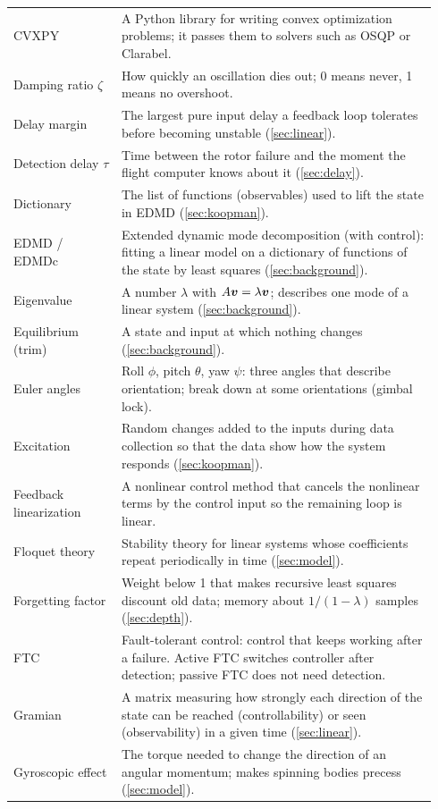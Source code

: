 \begin{longtable}{p{0.24\linewidth}p{0.70\linewidth}}
CVXPY & A Python library for writing convex optimization problems; it passes them to solvers such as OSQP or Clarabel. \\
Damping ratio $\zeta$ & How quickly an oscillation dies out; 0 means never, 1 means no overshoot. \\
Delay margin & The largest pure input delay a feedback loop tolerates before becoming unstable (\ref{sec:linear}). \\
Detection delay $\tau$ & Time between the rotor failure and the moment the flight computer knows about it (\ref{sec:delay}). \\
Dictionary & The list of functions (observables) used to lift the state in EDMD (\ref{sec:koopman}). \\
EDMD / EDMDc & Extended dynamic mode decomposition (with control): fitting a linear model on a dictionary of functions of the state by least squares (\ref{sec:background}). \\
Eigenvalue & A number $\lambda$ with $A\boldsymbol{v} = \lambda\boldsymbol{v}$; describes one mode of a linear system (\ref{sec:background}). \\
Equilibrium (trim) & A state and input at which nothing changes (\ref{sec:background}). \\
Euler angles & Roll $\phi$, pitch $\theta$, yaw $\psi$: three angles that describe orientation; break down at some orientations (gimbal lock). \\
Excitation & Random changes added to the inputs during data collection so that the data show how the system responds (\ref{sec:koopman}). \\
Feedback linearization & A nonlinear control method that cancels the nonlinear terms by the control input so the remaining loop is linear. \\
Floquet theory & Stability theory for linear systems whose coefficients repeat periodically in time (\ref{sec:model}). \\
Forgetting factor & Weight below 1 that makes recursive least squares discount old data; memory about $1/(1-\lambda)$ samples (\ref{sec:depth}). \\
FTC & Fault-tolerant control: control that keeps working after a failure. Active FTC switches controller after detection; passive FTC does not need detection. \\
Gramian & A matrix measuring how strongly each direction of the state can be reached (controllability) or seen (observability) in a given time (\ref{sec:linear}). \\
Gyroscopic effect & The torque needed to change the direction of an angular momentum; makes spinning bodies precess (\ref{sec:model}). \\

\end{longtable}
